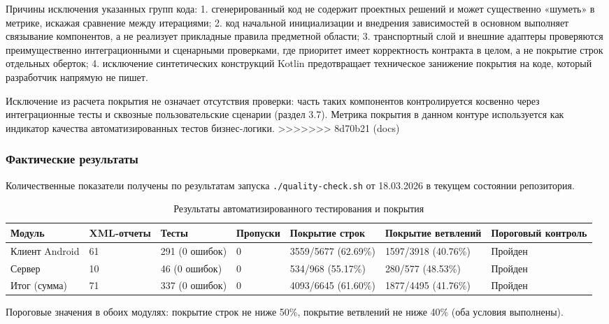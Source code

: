Причины исключения указанных групп кода:
1. сгенерированный код не содержит проектных решений и может существенно «шуметь» в метрике, искажая сравнение между итерациями;
2. код начальной инициализации и внедрения зависимостей в основном выполняет связывание компонентов, а не реализует прикладные правила предметной области;
3. транспортный слой и внешние адаптеры проверяются преимущественно интеграционными и сценарными проверками, где приоритет имеет корректность контракта в целом, а не покрытие строк отдельных оберток;
4. исключение синтетических конструкций Kotlin предотвращает техническое занижение покрытия на коде, который разработчик напрямую не пишет.

Исключение из расчета покрытия не означает отсутствия проверки: часть таких компонентов контролируется косвенно через интеграционные тесты и сквозные пользовательские сценарии (раздел 3.7). Метрика покрытия в данном контуре используется как индикатор качества автоматизированных тестов бизнес-логики.
>>>>>>> 8d70b21 (docs)

\subsubsection{Фактические результаты}

Количественные показатели получены по результатам запуска \texttt{./quality-check.sh} от 18.03.2026 в текущем состоянии репозитория.

\begin{table}[H]
\centering
\small
\caption{Результаты автоматизированного тестирования и покрытия}
\begin{tabular}{|p{2.0cm}|p{1.0cm}|p{1.2cm}|p{1.0cm}|p{2.1cm}|p{2.1cm}|p{1.6cm}|}
\hline
Модуль & XML-отчеты & Тесты & Пропуски & Покрытие строк & Покрытие ветвлений & Пороговый контроль \\ 
\hline
Клиент Android & 61 & 291 (0 ошибок) & 0 & 3559/5677 (62.69\%) & 1597/3918 (40.76\%) & Пройден \\ 
\hline
Сервер & 10 & 46 (0 ошибок) & 0 & 534/968 (55.17\%) & 280/577 (48.53\%) & Пройден \\ 
\hline
Итог (сумма) & 71 & 337 (0 ошибок) & 0 & 4093/6645 (61.60\%) & 1877/4495 (41.76\%) & Пройден \\ 
\hline
\end{tabular}
\end{table}

Пороговые значения в обоих модулях: покрытие строк не ниже 50\%, покрытие ветвлений не ниже 40\% (оба условия выполнены).

